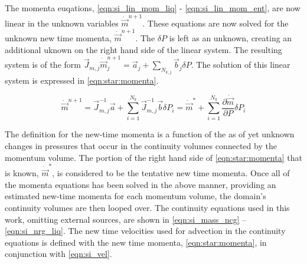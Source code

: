 The momenta euqations, \eqref{eqn:si_lin_mom_liq} - \eqref{eqn:si_lin_mom_ent}, are now linear in the unknown variables $\dot{\vec{m}}^{n+1}$.
These equations are now solved for the unknown new time momenta, $\dot{\vec{m}}^{n+1}$.
The $\delta P$ is left as an unknown, creating an additional uknown on the right hand side of the linear system.
The resulting system is of the form $\vec{J}_{m, j} \dot{\vec{m}}_{j}^{n+1} = \vec{a}_{j} + \sum_{N_{k,j}} \vec{b}_{j} \delta P$.
The solution of this linear system is expressed in \eqref{eqn:star:momenta}.

\begin{equation}
\label{eqn:star:momenta}
\dot{\vec{m}}^{n+1} = \vec{J}_{m,j}^{-1} \vec{a} + \sum^{N_{k}}_{i = 1} \vec{J}_{m,j}^{-1} \vec{b} \delta P_{i} = \dot{\vec{m}}^{*} + \sum^{N_{k}}_{i = 1} \frac{\partial \dot{\vec{m}}}{\partial P} \delta P_{i}
\end{equation}

The definition for the new-time momenta is a function of the as of yet unknown changes in pressures that occur in the continuity volumes connected by the momentum volume.
The portion of the right hand side of \eqref{eqn:star:momenta} that is known, $\dot{\vec{m}}^{*}$, is considered to be the tentative new time momenta.
Once all of the momenta equations has been solved in the above manner, providing an estimated new-time momenta for each momentum volume, the domain's continuity volumes are then looped over.
The continuity equations used in this work, omitting external sources, are shown in \eqref{eqn:si_mass_ncg} -- \eqref{eqn:si_nrg_liq}. 
The new time velocities used for advection in the continuity equations is defined with the new time momenta, \eqref{eqn:star:momenta}, in conjunction with \eqref{eqn:si_vel}.


